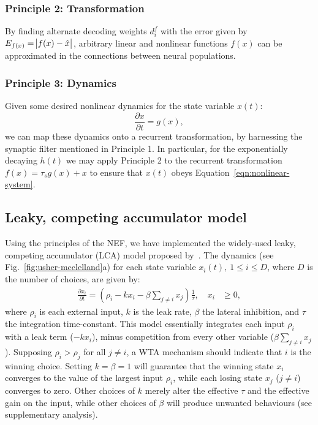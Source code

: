 \documentclass[10pt,letterpaper]{article}
\begin{document}
\subsubsection{Principle 2: Transformation}
By finding alternate decoding weights $d^f_i$ with the error given by $E_{f(x)} = \abs{f(x) - \hat x}$, arbitrary linear and nonlinear functions $f(x)$ can be approximated in the connections between neural populations.

\subsubsection{Principle 3: Dynamics}
Given some desired nonlinear dynamics for the state variable $x(t)$:
\begin{equation} \label{eqn:nonlinear-system}
    \frac{\partial x}{\partial t} = g(x) ,
\end{equation}
we can map these dynamics onto a recurrent transformation, by harnessing the synaptic filter mentioned in Principle 1.
In particular, for the exponentially decaying $h(t)$ we may apply Principle 2 to the recurrent transformation $f(x) = \tau_s g(x) + x$ to ensure that $x(t)$ obeys Equation~\ref{eqn:nonlinear-system}.

\subsection{Leaky, competing accumulator model}
Using the principles of the NEF, we have implemented the widely-used leaky, competing accumulator (LCA) model proposed by~.
The dynamics (see Fig.~\ref{fig:usher-mcclelland}a) for each state variable $x_i(t),\ 1 \leq i \leq D$, where $D$ is the number of choices, are given by:
\begin{equation} \label{eqn:usher-mcclelland}
    \begin{split}
        \frac{{\partial x}_i}{\partial t} = \left(\rho_i - kx_i - \beta \sum_{j \neq i} x_j\right) \frac{1}{\tau}, \quad x_i &\ge 0,
    \end{split}
\end{equation}
where $\rho_i$ is each external input, $k$ is the leak rate, $\beta$ the lateral inhibition, and $\tau$ the integration time-constant.
This model essentially integrates each input $\rho_i$ with a leak term ($- kx_i$), minus competition from every other variable ($\beta \sum_{j \neq i} x_j$).
Supposing $\rho_i > \rho_j$ for all $j \ne i$, a WTA mechanism should indicate that $i$ is the winning choice.
Setting $k = \beta = 1$ will guarantee that the winning state $x_i$ converges to the value of the largest input $\rho_i$, while each losing state $x_j$ ($j \ne i$) converges to zero.
Other choices of $k$ merely alter the effective $\tau$ and the effective gain on the input, while other choices of $\beta$ will produce unwanted behaviours (see supplementary analysis).
\end{document}
